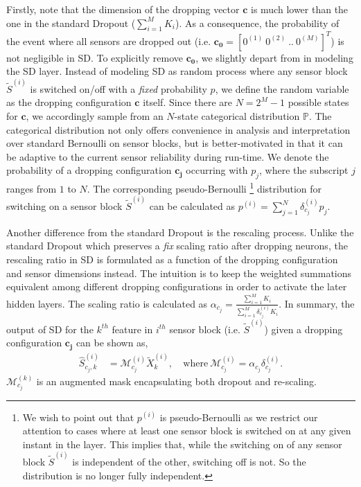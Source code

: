 \documentclass[../thesis.tex]{subfiles}
\begin{document}
Firstly, note that the dimension of the dropping vector $\mathbf{c}$ is much lower than the one in the standard Dropout ($\sum_{i=1}^M K_i$). As a consequence, the probability of the event where all sensors are dropped out (i.e. $\mathbf{{c_0}} = [0^{(1)}~0^{(2)}~..~0^{(M)}]^T$) is not negligible in SD. To explicitly remove $\mathbf{{c_0}}$, we slightly depart from \cite{dropout} in modeling the SD layer. Instead of modeling SD as random process where any sensor block $\tilde{S}^{(i)}$ is switched on/off with a \textit{fixed} probability $p$, we define the random variable as the dropping configuration $\mathbf{c}$ itself. Since there are $N = 2^M - 1$ possible states for $\mathbf{c}$, we accordingly sample from an $N$-state categorical distribution $\mathbb{P}$. The categorical distribution not only offers convenience in analysis and interpretation over standard Bernoulli on sensor blocks, but is better-motivated in that it can be adaptive to the current sensor reliability during run-time. We denote the probability of a dropping configuration $\mathbf{{c_j}}$ occurring with $p_j$, where the subscript $j$ ranges from $1$ to $N$. The corresponding pseudo-Bernoulli
\footnote{ 
We wish to point out that $p^{(i)}$ is pseudo-Bernoulli as we restrict our attention to cases where at least one sensor block is switched on at any given instant in the layer. This implies that, while the switching on of any sensor block $\tilde{S}^{(i)}$ is independent of the other, switching off is not. So the distribution is no longer fully independent.
}
distribution for switching on a sensor block $\tilde{S}^{(i)}$ can be calculated as $p^{(i)} = \sum_{j=1}^N\delta_{c_j}^{(i)} p_j$. 


Another difference from the standard Dropout is the rescaling process. Unlike the standard Dropout which preserves a \textit{fix} scaling ratio after dropping neurons, the rescaling ratio in SD is formulated as a function of the dropping configuration and sensor dimensions instead. The intuition is to keep the weighted summations equivalent among different dropping configurations in order to activate the later hidden layers. The scaling ratio is calculated as $\alpha_{c_j} = \frac{\sum_{i=1}^M K_i }{\sum_{i=1}^M \delta_{c_j}^{(i)} K_i}.$ In summary, the output of SD for the $k^{th}$ feature in $i^{th}$ sensor block (i.e. $\tilde{S}^{(i)}$) given a dropping configuration $\mathbf{c_j}$ can be shown as,
\begin{align}
\hat{S}^{(i)}_{{c_j},k} &= \mathcal{M}^{(i)}_{c_j} \tilde{X}_k^{(i)}, \ 
&\text{where} \ \mathcal{M}^{(i)}_{c_j} = \alpha_{c_j} \delta_{c_j}^{(i)}. 
\end{align}
$\mathcal{M}^{(k)}_{c_j}$ is an augmented mask encapsulating both dropout and re-scaling. 
 
\end{document}
